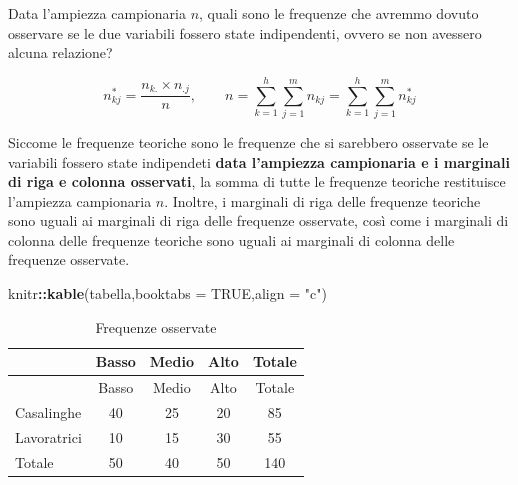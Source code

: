 \documentclass[
  a4paper,
  DIV=11,
  numbers=noendperiod]{scrreprt}
\newenvironment{Shaded}{\begin{snugshade}}{\end{snugshade}}
\newcommand{\AttributeTok}[1]{\textcolor[rgb]{0.13,0.29,0.53}{#1}}
\newcommand{\ConstantTok}[1]{\textcolor[rgb]{0.56,0.35,0.01}{#1}}
\newcommand{\FunctionTok}[1]{\textcolor[rgb]{0.13,0.29,0.53}{\textbf{#1}}}
\newcommand{\NormalTok}[1]{#1}
\newcommand{\SpecialCharTok}[1]{\textcolor[rgb]{0.81,0.36,0.00}{\textbf{#1}}}
\newcommand{\StringTok}[1]{\textcolor[rgb]{0.31,0.60,0.02}{#1}}
\begin{document}
\begin{tcolorbox}[enhanced jigsaw, toprule=.15mm, left=2mm, leftrule=.75mm, breakable, coltitle=black, title={\(n_{kj}^*\): Significato}, bottomtitle=1mm, opacitybacktitle=0.6, toptitle=1mm, titlerule=0mm, bottomrule=.15mm, colframe=quarto-callout-tip-color-frame, arc=.35mm, rightrule=.15mm, opacityback=0, colbacktitle=quarto-callout-tip-color!10!white, colback=white]

Data l'ampiezza campionaria \(n\), quali sono le frequenze che avremmo
dovuto osservare se le due variabili fossero state indipendenti, ovvero
se non avessero alcuna relazione?

\[n_{kj}^* = \dfrac{n_{k.} \times n_{.j}}{n}, \qquad n = \sum_{k=1}^h \sum_{j=1}^m n_{kj} = \sum_{k=1}^h \sum_{j=1}^m n_{kj}^*\]

\end{tcolorbox}

Siccome le frequenze teoriche sono le frequenze che si sarebbero
osservate se le variabili fossero state indipendeti \textbf{data
l'ampiezza campionaria e i marginali di riga e colonna osservati}, la
somma di tutte le frequenze teoriche restituisce l'ampiezza campionaria
\(n\). Inoltre, i marginali di riga delle frequenze teoriche sono uguali
ai marginali di riga delle frequenze osservate, così come i marginali di
colonna delle frequenze teoriche sono uguali ai marginali di colonna
delle frequenze osservate.

\begin{Shaded}
\begin{Highlighting}[]
\NormalTok{knitr}\SpecialCharTok{::}\FunctionTok{kable}\NormalTok{(tabella,}\AttributeTok{booktabs =} \ConstantTok{TRUE}\NormalTok{,}\AttributeTok{align =} \StringTok{"c"}\NormalTok{)}
\end{Highlighting}
\end{Shaded}

\begin{longtable}[]{@{}lcccc@{}}
\caption{Frequenze osservate}\tabularnewline
\toprule\noalign{}
& Basso & Medio & Alto & Totale \\
\midrule\noalign{}
\endfirsthead
\toprule\noalign{}
& Basso & Medio & Alto & Totale \\
\midrule\noalign{}
\endhead
\bottomrule\noalign{}
\endlastfoot
Casalinghe & 40 & 25 & 20 & 85 \\
Lavoratrici & 10 & 15 & 30 & 55 \\
Totale & 50 & 40 & 50 & 140 \\
\end{longtable}
\end{document}
